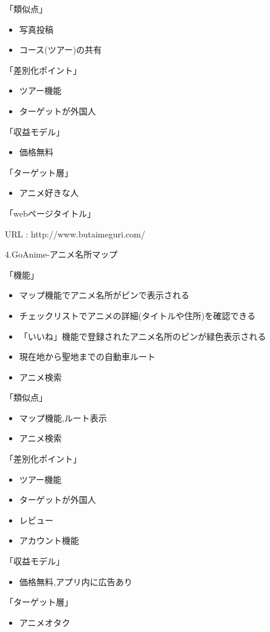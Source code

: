 「類似点」
\begin{itemize}
\item 写真投稿
\item コース(ツアー)の共有
\end{itemize}
「差別化ポイント」
\begin{itemize}
\item ツアー機能
\item ターゲットが外国人
\end{itemize}
「収益モデル」
\begin{itemize}
\item 価格無料
\end{itemize}
「ターゲット層」
\begin{itemize}
\item アニメ好きな人
\end{itemize}
「webページタイトル」
\par URL : http://www.butaimeguri.com/
\\
\par 4.GoAnime-アニメ名所マップ
\par 「機能」
\begin{itemize}
\item マップ機能でアニメ名所がピンで表示される
\item チェックリストでアニメの詳細(タイトルや住所)を確認できる
\item 「いいね」機能で登録されたアニメ名所のピンが緑色表示される
\item 現在地から聖地までの自動車ルート
\item アニメ検索
\end{itemize}
「類似点」
\begin{itemize}
\item マップ機能,ルート表示
\item アニメ検索
\end{itemize}
「差別化ポイント」
\begin{itemize}
\item ツアー機能
\item ターゲットが外国人
\item レビュー
\item アカウント機能
\end{itemize}
「収益モデル」
\begin{itemize}
\item 価格無料,アプリ内に広告あり
\end{itemize}
「ターゲット層」
\begin{itemize}
\item アニメオタク
\end{itemize}

